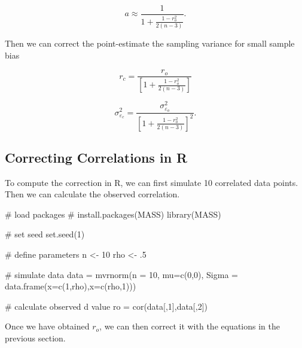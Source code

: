 \documentclass[
  letterpaper,
  DIV=11,
  numbers=noendperiod]{scrreprt}
\newenvironment{Shaded}{\begin{snugshade}}{\end{snugshade}}
\newcommand{\AttributeTok}[1]{\textcolor[rgb]{0.40,0.45,0.13}{#1}}
\newcommand{\CommentTok}[1]{\textcolor[rgb]{0.37,0.37,0.37}{#1}}
\newcommand{\DecValTok}[1]{\textcolor[rgb]{0.68,0.00,0.00}{#1}}
\newcommand{\FunctionTok}[1]{\textcolor[rgb]{0.28,0.35,0.67}{#1}}
\newcommand{\NormalTok}[1]{\textcolor[rgb]{0.00,0.23,0.31}{#1}}
\newcommand{\OtherTok}[1]{\textcolor[rgb]{0.00,0.23,0.31}{#1}}
\begin{document}
\[
a \approx \frac{1}{1+\frac{1-r_o^2}{2(n-3)}}.
\]

Then we can correct the point-estimate the sampling variance for small
sample bias

\[
r_c = \frac{r_o}{\left[ 1+\frac{1-r_o^2}{2(n-3)}\right]}
\]

\[
\sigma^2_{\varepsilon_c} = \frac{\sigma^2_{\varepsilon_o}}{\left[ 1+\frac{1-r_o^2}{2(n-3)}\right]^2}.
\]

\hypertarget{correcting-correlations-in-r}{%
\subsection{Correcting Correlations in
R}\label{correcting-correlations-in-r}}

To compute the correction in R, we can first simulate 10 correlated data
points. Then we can calculate the observed correlation.

\begin{Shaded}
\begin{Highlighting}[]
\CommentTok{\# load packages}
\CommentTok{\# install.packages(\textquotesingle{}MASS\textquotesingle{})}
\FunctionTok{library}\NormalTok{(MASS)}

\CommentTok{\# set seed}
\FunctionTok{set.seed}\NormalTok{(}\DecValTok{1}\NormalTok{)}

\CommentTok{\# define parameters}
\NormalTok{n }\OtherTok{\textless{}{-}} \DecValTok{10}
\NormalTok{rho }\OtherTok{\textless{}{-}}\NormalTok{ .}\DecValTok{5}

\CommentTok{\# simulate data}
\NormalTok{data }\OtherTok{=} \FunctionTok{mvrnorm}\NormalTok{(}\AttributeTok{n =} \DecValTok{10}\NormalTok{,}
               \AttributeTok{mu=}\FunctionTok{c}\NormalTok{(}\DecValTok{0}\NormalTok{,}\DecValTok{0}\NormalTok{),}
               \AttributeTok{Sigma =} \FunctionTok{data.frame}\NormalTok{(}\AttributeTok{x=}\FunctionTok{c}\NormalTok{(}\DecValTok{1}\NormalTok{,rho),}\AttributeTok{x=}\FunctionTok{c}\NormalTok{(rho,}\DecValTok{1}\NormalTok{)))}

\CommentTok{\# calculate observed d value}
\NormalTok{ro }\OtherTok{=} \FunctionTok{cor}\NormalTok{(data[,}\DecValTok{1}\NormalTok{],data[,}\DecValTok{2}\NormalTok{])}
\end{Highlighting}
\end{Shaded}

Once we have obtained \(r_o\), we can then correct it with the equations
in the previous section.
\end{document}
